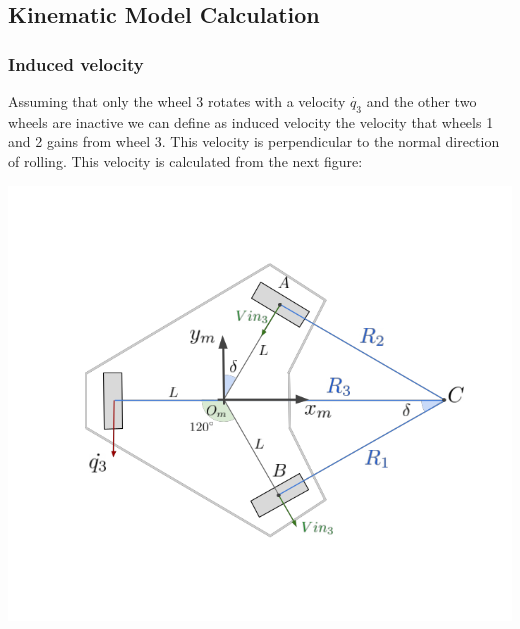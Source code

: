 \subsection{Kinematic Model Calculation}

    
    
\subsubsection{Induced velocity}
Assuming that only the wheel 3 rotates with a velocity $\dot{q_{3}}$ and the other two wheels are inactive we can define as induced velocity the velocity that wheels 1 and 2 gains from wheel 3. This velocity is perpendicular to the normal direction of rolling. This velocity is calculated from the next figure:

\includegraphics[scale=0.43]{figures/robot3.png}

